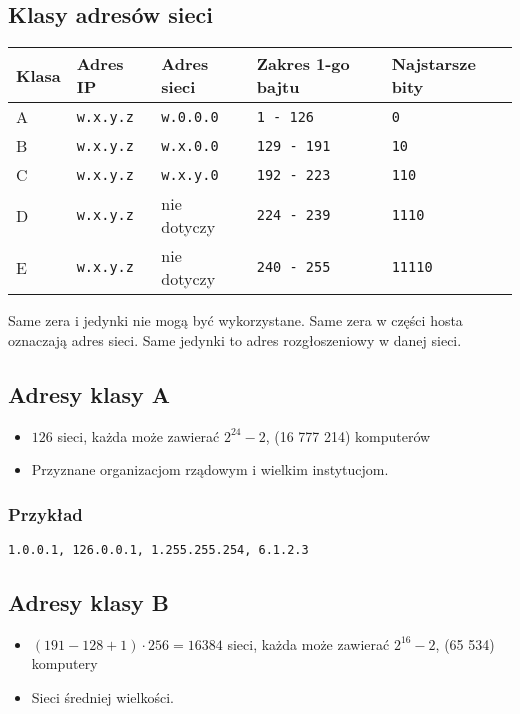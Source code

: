 \documentclass[../sk-egzamin.tex]{subfiles}
\begin{document}

\subsection*{Klasy adresów sieci}

\begin{tabularx}{\textwidth}{|X|X|X|X|X|}
 \hline
\textbf{Klasa} & \textbf{Adres IP} & \textbf{Adres sieci} & \textbf{Zakres 1-go bajtu} & \textbf{Najstarsze bity} \\
\hline
A & \texttt{w.x.y.z} & \texttt{w.0.0.0} & \texttt{1 - 126} & \texttt{0} \\
\hline
B & \texttt{w.x.y.z} & \texttt{w.x.0.0} & \texttt{129 - 191} & \texttt{10} \\
\hline
C & \texttt{w.x.y.z} & \texttt{w.x.y.0} & \texttt{192 - 223} & \texttt{110} \\
\hline
D & \texttt{w.x.y.z} & nie dotyczy & \texttt{224 - 239} & \texttt{1110} \\
\hline
E & \texttt{w.x.y.z} & nie dotyczy & \texttt{240 - 255} & \texttt{11110} \\
\hline
\end{tabularx}

    Same zera i jedynki nie mogą być wykorzystane.
    Same zera w części hosta oznaczają adres sieci.
    Same jedynki to adres rozgłoszeniowy w danej sieci.

\subsection*{Adresy klasy A}
\begin{itemize}
    \item $126$ sieci, każda może zawierać $2^{24}-2$, (16 777 214) komputerów
    \item Przyznane organizacjom rządowym i wielkim instytucjom.
\end{itemize}

\subsubsection*{Przykład}
\begin{center}
\texttt{1.0.0.1, 126.0.0.1, 1.255.255.254, 6.1.2.3}
\end{center}

\subsection*{Adresy klasy B}
\begin{itemize}
    \item $(191-128+1)\cdot 256 = 16 384$ sieci, każda może zawierać $2^{16}-2$,
    (65 534) komputery
    \item Sieci średniej wielkości.
\end{itemize}
\end{document}
